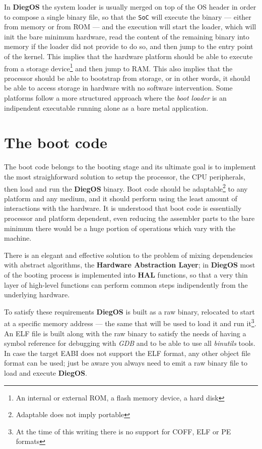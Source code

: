 \documentclass[11pt,b5paper]{scrbook}
\newcommand{\myOS}{{\color{SteelBlue}\textbf{DiegOS}}}
\begin{document}
In {\myOS} the system loader is usually merged on top of the OS header in order to compose
a single binary file, so that the \texttt{SoC} will execute the binary --- either from memory or from ROM --- 
and the execution will start the loader, which will init
the bare minimum hardware, read the content of the remaining binary into memory if the loader did not
provide to do so, and then jump to the entry point of the kernel.
This implies that the hardware platform should be able to execute from a storage device\footnote{An internal or external ROM,
a flash memory device, a hard disk} and then jump to RAM.
This also implies that the processor should be able to bootstrap from storage, or in other words, it should be able to access
storage in hardware with no software intervention.
Some platforms follow a more structured approach where the \textit{boot loader} is an indipendent executable running alone as
a bare metal application.

\section{The boot code}

The boot code belongs to the booting stage and its ultimate goal is to
implement the most straighforward solution to setup the processor, the CPU
peripherals, then load and run the {\myOS} binary.
Boot code should be adaptable\footnote{Adaptable does not imply portable} to any platform and any medium,
and it should perform using the least amount of interactions with the hardware.
It is understood that boot code is essentially processor and platform dependent,
even reducing the assembler parts to the bare minimum there would be a huge
portion of operations which vary with the machine.

There is an elegant and effective solution to the problem of mixing
dependencies with abstract algorithms, the \textbf{Hardware
Abstraction Layer}; in {\myOS} most of the booting process is
implemented into \textbf{HAL} functions, so that a very thin layer of
high-level functions can perform common steps indipendently from the
underlying hardware.

To satisfy these requirements {\myOS} is built as a raw binary, relocated
to start at a specific memory address --- the same that will be used to 
load it and run it\footnote{At the time of this writing there is no support
for COFF, ELF or PE formats}.
An ELF file is built along with the raw binary to satisfy the needs of having
a symbol reference for debugging with \textit{GDB} and to be able to use
all \textit{binutils} tools.
In case the target EABI does not support the ELF format, any other object file
format can be used; just be aware you always need to emit a raw binary file to
load and execute {\myOS}.
\end{document}
